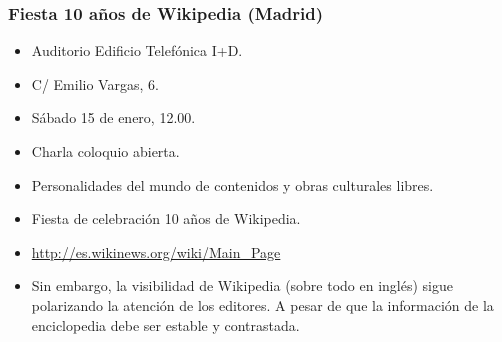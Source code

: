 \begin{frame}
\frametitle{Fiesta 10 años de Wikipedia (Madrid)}

    \begin{itemize}
      \item Auditorio Edificio Telefónica I+D.
      \item C/ Emilio Vargas, 6.
      \item Sábado 15 de enero, 12.00.
      \item Charla coloquio abierta.
      \item Personalidades del mundo de contenidos y obras culturales libres.
      \item Fiesta de celebración 10 años de Wikipedia.

      \item \url{http://es.wikinews.org/wiki/Main_Page}

      \item Sin embargo, la visibilidad de Wikipedia (sobre todo en inglés)
sigue polarizando la atención de los editores. A pesar de que la información
de la enciclopedia debe ser estable y contrastada.

    \end{itemize}


\end{frame}
